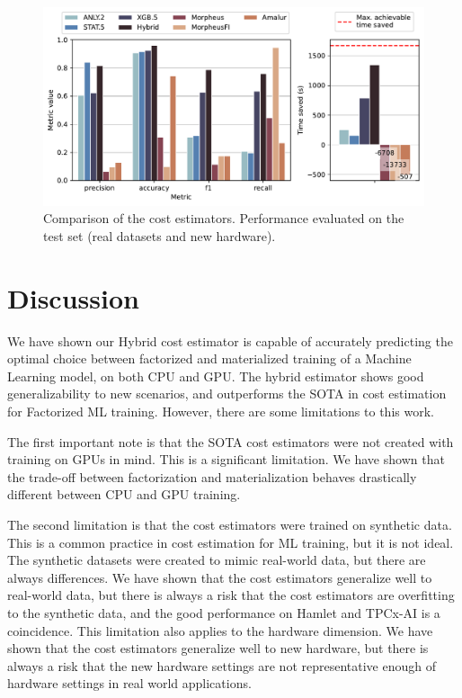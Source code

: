 \begin{figure}[ht]
    \centering
    \includegraphics[width=\linewidth]{chapters/06_evaluation/figures/eval_sota_results.pdf}
    \caption[Cost estimator comparison vs. SOTA]{Comparison of the cost estimators. Performance evaluated on the test set (real datasets and new hardware).}
    \label{fig:6-sota-comparison}
\end{figure}

\section{Discussion}
\label{sec:eval-discussion}
We have shown our Hybrid cost estimator is capable of accurately predicting the optimal choice between factorized and materialized training of a Machine Learning model, on both CPU and GPU. The hybrid estimator shows good generalizability to new scenarios, and outperforms the SOTA in cost estimation for Factorized ML training. However, there are some limitations to this work.

The first important note is that the SOTA cost estimators were not created with training on GPUs in mind. This is a significant limitation. We have shown that the trade-off between factorization and materialization behaves drastically different between CPU and GPU training.

The second limitation is that the cost estimators were trained on synthetic data. This is a common practice in cost estimation for ML training, but it is not ideal. The synthetic datasets were created to mimic real-world data, but there are always differences. We have shown that the cost estimators generalize well to real-world data, but there is always a risk that the cost estimators are overfitting to the synthetic data, and the good performance on Hamlet and TPCx-AI is a coincidence. This limitation also applies to the hardware dimension. We have shown that the cost estimators generalize well to new hardware, but there is always a risk that the new hardware settings are not representative enough of hardware settings in real world applications.

